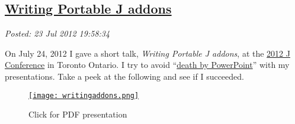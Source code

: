 %

\subsection*{\href{http://bakerjd99.wordpress.com/2012/07/23/writing-portable-j-addons/}{Writing Portable J addons}}


\noindent\emph{Posted: 23 Jul 2012 19:58:34}
\vspace{6pt}

On July 24, 2012 I gave a short talk, \emph{Writing Portable J addons},
at the
\href{http://www.jsoftware.com/jwiki/Community/Conference2012}{2012 J
Conference} in Toronto Ontario. I try to avoid
``\href{http://www.slideshare.net/thecroaker/death-by-powerpoint}{death
by PowerPoint}'' with my presentations. Take a peek at the following and
see if I succeeded.



\captionsetup[figure]{labelformat=empty}
\begin{figure}[htbp]
\centering
\href{https://github.com/bakerjd99/jacks/blob/master/dogpony/WritingPortableJaddons.pdf}{\texttt{[image: writingaddons.png]}}
\caption{Click for PDF presentation}
\label{fig:3059X0}
\end{figure}



%